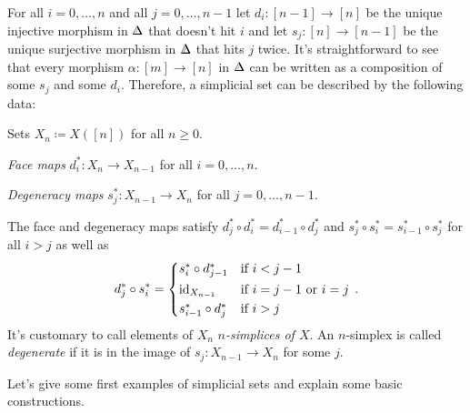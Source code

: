 \begin{con}\label{con:FaceDegeneracyMaps}
	For all $i=0,\dotsc,n$ and all $j=0,\dotsc,n-1$ let $d_i\colon [n-1]\rightarrow [n]$ be the unique injective morphism in $\IDelta$ that doesn't hit $i$ and let $s_j\colon [n]\rightarrow[n-1]$ be the unique surjective morphism in $\IDelta$ that hits $j$ twice. It's straightforward to see that every morphism $\alpha\colon [m]\rightarrow[n]$ in $\IDelta$ can be written as a composition of some $s_j$ and some $d_i$. Therefore, a simplicial set can be described by the following data:
	\begin{alphanumerate}
		\item Sets $X_n\coloneqq X([n])$ for all $n\geqslant 0$.
		\item \emph{Face maps} $d_i^*\colon X_n\rightarrow X_{n-1}$ for all $i=0,\dotsc,n$.
		\item \emph{Degeneracy maps} $s_j^*\colon X_{n-1}\rightarrow X_{n}$ for all $j=0,\dotsc,n-1$.
	\end{alphanumerate}
	The face and degeneracy maps satisfy $d_j^*\circ d_i^*=d_{i-1}^*\circ d_j^*$ and $s_j^*\circ s_i^*=s_{i-1}^*\circ s_j^*$ for all $i>j$ as well as
	\begin{equation*}
		d_j^*\circ s_i^*=\begin{cases*}
			s_i^*\circ d_{j-1}^* & if $i<j-1$\\
			\id_{X_{n-1}} & if $i=j-1$ or $i=j$\\
			s_{i-1}^*\circ d_j^* & if $i>j$
		\end{cases*}\,.
	\end{equation*}
	It's customary to call elements of $X_n$ \emph{$n$-simplices of $X$}. An $n$-simplex is called \emph{degenerate} if it is in the image of $s_j\colon X_{n-1}\rightarrow X_n$ for some $j$.
\end{con}
Let's give some first examples of simplicial sets and explain some basic constructions. %

